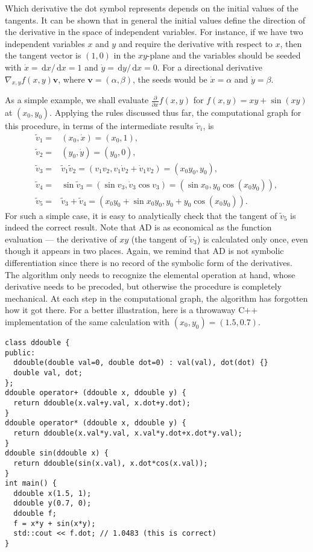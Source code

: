 \documentclass{article}
\newcommand{\D}{\,\textrm{d}}
\begin{document}
Which derivative the dot symbol represents depends on the initial
values of the tangents. It can be shown that in general the initial
values define the direction of the derivative in the space of
independent variables. For instance, if we have two independent
variables $x$ and $y$ and require the derivative with respect to $x$,
then the tangent vector is $(1,0)$ in the $xy$-plane and the variables
should be seeded with $\dot x = \D x/\D x = 1$ and
$\dot y = \D y/\D x = 0$. For a directional derivative
$\nabla_{x,y}f(x,y) \bm v$, where $\bm v = (\alpha, \beta)$, the seeds
would be $\dot x = \alpha$ and $\dot y = \beta$.

As a simple example, we shall evaluate
$\frac{\partial}{\partial x} f(x, y)$ for $f(x, y) = x y + \sin (xy)$
at $(x_0,y_0)$. Applying the rules discussed thus far, the
computational graph for this procedure, in terms of the intermediate
results $\tilde v_i$, is
\begin{equation}
  \label{eq:forward_example}
  \begin{split}
    \tilde v_1 =& (x_0,\dot x) = (x_0,1), \\
    \tilde v_2 =& (y_0,\dot y) = (y_0,0), \\
    \tilde v_3 =& \tilde v_1\tilde v_2 = (v_1v_2, v_1 \dot v_2 +
    \dot v_1 v_2) = (x_0y_0, y_0), \\
    \tilde v_4 =& \sin \tilde v_3 = (\sin v_3, \dot v_3 \cos v_3) =
    (\sin x_0, y_0 \cos (x_0y_0)), \\
    \tilde v_5 =& \tilde v_3 + \tilde v_4 = (x_0y_0 + \sin x_0y_0, y_0
    + y_0 \cos (x_0y_0)).
  \end{split}
\end{equation}
For such a simple case, it is easy to analytically check that the
tangent of $\tilde v_5$ is indeed the correct result. Note that AD is
as economical as the function evaluation --- the derivative of $xy$
(the tangent of $\tilde v_3$) is calculated only once, even though it
appears in two places. Again, we remind that AD is not symbolic
differentiation since there is no record of the symbolic form of the
derivatives. The algorithm only needs to recognize the elemental
operation at hand, whose derivative needs to be precoded, but
otherwise the procedure is completely mechanical. At each step in the
computational graph, the algorithm has forgotten how it got there. For
a better illustration, here is a throwaway C++ implementation of the
same calculation with $(x_0,y_0) = (1.5,0.7)$.
\begin{verbatim}
class ddouble {
public:
  ddouble(double val=0, double dot=0) : val(val), dot(dot) {}
  double val, dot;
};
ddouble operator+ (ddouble x, ddouble y) {
  return ddouble(x.val+y.val, x.dot+y.dot);
}
ddouble operator* (ddouble x, ddouble y) {
  return ddouble(x.val*y.val, x.val*y.dot+x.dot*y.val);
}
ddouble sin(ddouble x) {
  return ddouble(sin(x.val), x.dot*cos(x.val));
}
int main() {
  ddouble x(1.5, 1);
  ddouble y(0.7, 0);
  ddouble f;
  f = x*y + sin(x*y);
  std::cout << f.dot; // 1.0483 (this is correct)
}
\end{verbatim}
\end{document}
